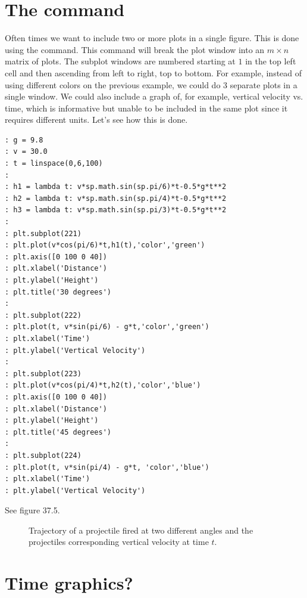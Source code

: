 \begin{problem} 
\end{problem}

\section{The  command}  
Often times we want to include two or more plots in a single figure.  This is done using the  command.  This command will break the plot window into an $m\times n$ matrix of plots.  The subplot windows are numbered starting at $1$ in the top left cell and then ascending from left to right, top to bottom.  For example, instead of using different colors on the previous example, we could do 3 separate plots in a single window.  We could also include a graph of, for example, vertical velocity vs. time, which is informative but unable to be included in the same plot since it requires different units.  Let's see how this is done.

\begin{lstlisting}[style=python]
: g = 9.8
: v = 30.0
: t = linspace(0,6,100)
:
: h1 = lambda t: v*sp.math.sin(sp.pi/6)*t-0.5*g*t**2
: h2 = lambda t: v*sp.math.sin(sp.pi/4)*t-0.5*g*t**2
: h3 = lambda t: v*sp.math.sin(sp.pi/3)*t-0.5*g*t**2
:
: plt.subplot(221)
: plt.plot(v*cos(pi/6)*t,h1(t),'color','green')
: plt.axis([0 100 0 40])
: plt.xlabel('Distance')
: plt.ylabel('Height')
: plt.title('30 degrees')
:
: plt.subplot(222)
: plt.plot(t, v*sin(pi/6) - g*t,'color','green')
: plt.xlabel('Time')
: plt.ylabel('Vertical Velocity')
:
: plt.subplot(223)
: plt.plot(v*cos(pi/4)*t,h2(t),'color','blue')
: plt.axis([0 100 0 40])
: plt.xlabel('Distance')
: plt.ylabel('Height')
: plt.title('45 degrees')
:
: plt.subplot(224)
: plt.plot(t, v*sin(pi/4) - g*t, 'color','blue')
: plt.xlabel('Time')
: plt.ylabel('Vertical Velocity')
\end{lstlisting}

See figure 37.5.

\begin{figure}
\begin{center}
\caption{Trajectory of a projectile fired at two different angles and the projectiles corresponding vertical velocity at time $t$.}
\end{center}
\end{figure}

\section{Time graphics?}



